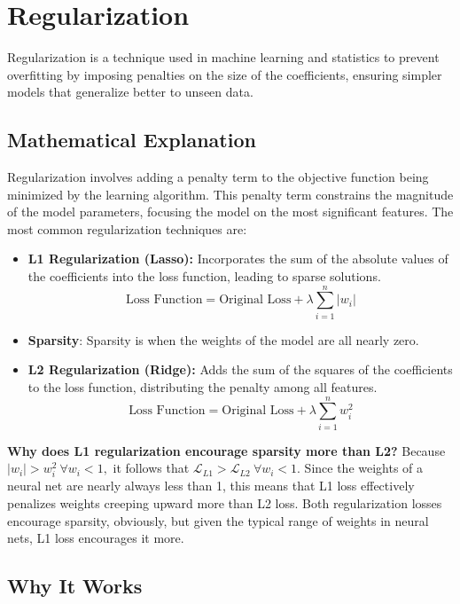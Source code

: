 \documentclass[12pt]{article}
\begin{document}
\section{Regularization}

Regularization is a technique used in machine learning and statistics to prevent overfitting by imposing penalties on the size of the coefficients, ensuring simpler models that generalize better to unseen data.

\subsection{Mathematical Explanation}

Regularization involves adding a penalty term to the objective function being minimized by the learning algorithm. This penalty term constrains the magnitude of the model parameters, focusing the model on the most significant features. The most common regularization techniques are:

\begin{itemize}
    \item \textbf{L1 Regularization (Lasso):} Incorporates the sum of the absolute values of the coefficients into the loss function, leading to sparse solutions.
    \[ \text{Loss Function} = \text{Original Loss} + \lambda \sum_{i=1}^{n} |w_i| \]
	\item \textbf{Sparsity}: Sparsity is when the weights of the model are all nearly zero. 
    
    \item \textbf{L2 Regularization (Ridge):} Adds the sum of the squares of the coefficients to the loss function, distributing the penalty among all features.
    \[ \text{Loss Function} = \text{Original Loss} + \lambda \sum_{i=1}^{n} w_i^2 \]
\end{itemize}

\textbf{Why does L1 regularization encourage sparsity more than L2?} Because \(|w_i| > w_i^2 \ \forall w_i < 1,\) it follows that \( \mathcal{L}_{L1} > \mathcal{L}_{L2} \ \forall w_i < 1\). Since the weights of a neural net are nearly always less than 1, this means that L1 loss effectively penalizes weights creeping upward more than L2 loss. Both regularization losses encourage sparsity, obviously, but given the typical range of weights in neural nets, L1 loss encourages it more. 

\subsection{Why It Works}
\end{document}
